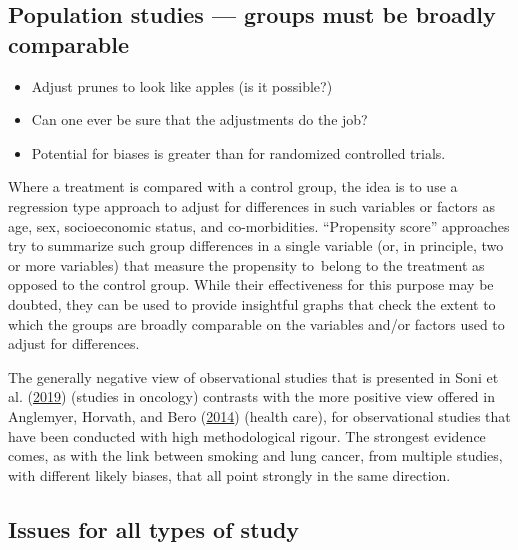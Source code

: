 \documentclass[
  10pt,
  b5paper]{book}
\providecommand{\tightlist}{%
  \setlength{\itemsep}{0pt}\setlength{\parskip}{0pt}}
\begin{document}
\hypertarget{population-studies-groups-must-be-broadly-comparable}{%
\subsection*{Population studies --- groups must be broadly comparable}\label{population-studies-groups-must-be-broadly-comparable}}

\begin{itemize}
\tightlist
\item
  Adjust prunes to look like apples (is it possible?)
\item
  Can one ever be sure that the adjustments do the job?
\item
  Potential for biases is greater than for randomized controlled
  trials.
\end{itemize}

Where a treatment is compared with a control group, the idea is to use a
regression type approach to adjust for differences in such variables or
factors as age, sex, socioeconomic status, and co-morbidities.
``Propensity score'' approaches try to summarize such group differences in
a single variable (or, in principle, two or more variables) that measure
the propensity to~belong to the treatment as opposed to the control
group. While their effectiveness for this purpose may be doubted, they
can be used to provide insightful graphs that check the extent to which
the groups are broadly comparable on the variables and/or factors used
to adjust for differences.

The generally negative view of observational studies that is presented
in Soni et al. (\protect\hyperlink{ref-soni2019comparison}{2019}) (studies in oncology) contrasts with the more
positive view offered in Anglemyer, Horvath, and Bero (\protect\hyperlink{ref-anglemyer2014healthcare}{2014}) (health care), for
observational studies that have been conducted with high methodological
rigour. The strongest evidence comes, as with the link between smoking
and lung cancer, from multiple studies, with different likely biases,
that all point strongly in the same direction.

\hypertarget{issues-for-all-types-of-study}{%
\subsection*{Issues for all types of study}\label{issues-for-all-types-of-study}}
\end{document}

